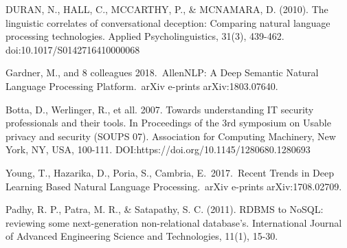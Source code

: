 \begin{thebibliography}{99}
DURAN, N., HALL, C., MCCARTHY, P., \& MCNAMARA, D. (2010). The linguistic correlates of conversational deception: Comparing natural language processing technologies. Applied Psycholinguistics, 31(3), 439-462. doi:10.1017/S0142716410000068

 Gardner, M., and 8 colleagues 2018.\ AllenNLP: A Deep Semantic Natural Language Processing Platform.\ arXiv e-prints arXiv:1803.07640.

 Botta, D., Werlinger, R., et all. 2007. Towards understanding IT security professionals and their tools. In Proceedings of the 3rd symposium on Usable privacy and security (SOUPS 07). Association for Computing Machinery, New York, NY, USA, 100-111. DOI:https://doi.org/10.1145/1280680.1280693

 Young, T., Hazarika, D., Poria, S., Cambria, E.\ 2017.\ Recent Trends in Deep Learning Based Natural Language Processing.\ arXiv e-prints arXiv:1708.02709.

 Padhy, R. P., Patra, M. R., \& Satapathy, S. C. (2011). RDBMS to NoSQL: reviewing some next-generation non-relational database's. International Journal of Advanced Engineering Science and Technologies, 11(1), 15-30.

\end{thebibliography}

